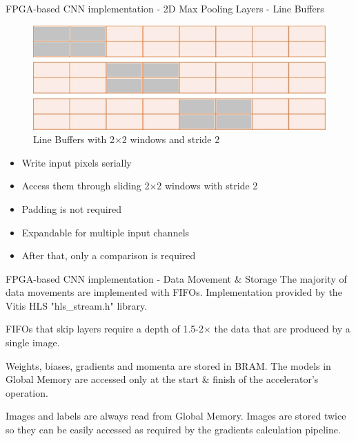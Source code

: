 \begin{frame}{FPGA-based CNN implementation - 2D Max Pooling Layers - Line Buffers}
	\begin{minipage}{0.5\textwidth}
    	\begin{figure}[H]
            \centering
    		\includegraphics[width=1\textwidth]{Images/Diagrams/maxp_accesss_patern.png}
            \caption*{Line Buffers with 2$\times$2 windows and stride 2}
    	\end{figure}%
	\end{minipage}%
	\begin{minipage}{0.5\textwidth}
    	\begin{itemize}
        	\item Write input pixels serially
            \item Access them through sliding 2$\times$2 windows with stride 2
            \item Padding is not required
    	    \item Expandable for multiple input channels
    	    \item After that, only a comparison is required
    	\end{itemize}
	\end{minipage}%
\end{frame}

\begin{frame}{FPGA-based CNN implementation - Data Movement \& Storage}
    The majority of data movements are implemented with FIFOs. Implementation provided by the Vitis HLS "hls\_stream.h" library. %
    
    FIFOs that skip layers require a depth of 1.5-2$\times$ the data that are produced by a single image.
    
    Weights, biases, gradients and momenta are stored in BRAM. The models in Global Memory are accessed only at the start \& finish of the accelerator's operation. %
    
    Images and labels are always read from Global Memory. Images are stored twice so they can be easily accessed as required by the gradients calculation pipeline.
\end{frame}


